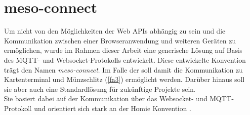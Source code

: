 \section{meso-connect}
\label{sec:meso-connect}

Um nicht von den Möglichkeiten der Web APIs abhängig zu sein und die Kommunikation
zwischen einer Browseranwendung und weiteren Geräten zu ermöglichen, wurde im Rahmen dieser
Arbeit eine generische Lösung auf Basis des MQTT- und Websocket-Protokolls entwickelt.
Diese entwickelte Konvention trägt den Namen \emph{meso-connect}.
Im Falle der \shst{} soll damit die Kommunikation zu Kartenterminal und Münzschlitz (\ref{fa3})
ermöglicht werden. Darüber hinaus soll sie aber auch eine Standardlösung für zukünftige 
Projekte sein. \\
Sie basiert dabei auf der Kommunikation über das Websocket- und MQTT-Protokoll und orientiert sich stark an 
der Homie Konvention \cite{homie}.



